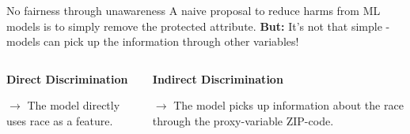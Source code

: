 \documentclass[11pt,compress,t,notes=noshow, xcolor=table]{beamer}
\begin{document}
\begin{vbframe}{No fairness through unawareness}
  A naive proposal to reduce harms from ML models is to simply remove the protected attribute.
  \textbf{But:} It's not that simple - models can pick up the information through other variables!
  \vspace{-.4cm}
  \begin{columns} 
    \begin{column}{0.5\textwidth}
    \begin{center}
    \textbf{Direct Discrimination}
    \vspace{.2cm}
    \end{center}
    \vfill
    $\rightarrow$ The model directly uses race as a feature.
    \end{column}
    \begin{column}{0.5\textwidth}
      \begin{center}
        \textbf{Indirect Discrimination}
        \vspace{.2cm}
        \end{center}
    \vfill
    $\rightarrow$ The model picks up information about the race through the proxy-variable ZIP-code.
    \end{column}
    \end{columns}
  \vfill
\end{vbframe}
\end{document}
